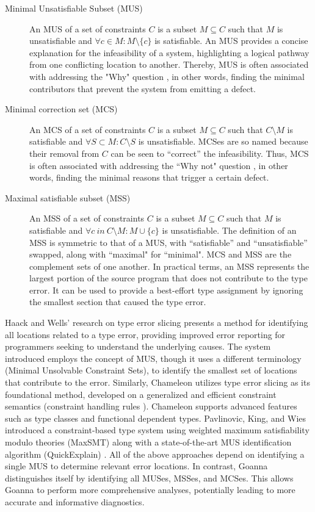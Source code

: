 \documentclass[pdflatex,lineno,sn-nature,Numbered]{sn-jnl}%
\begin{document}
\begin{description}
\item[Minimal Unsatisfiable Subset (MUS)] An MUS of a set of constraints $C$ is a subset $M \subseteq C$ such that $M$ is unsatisfiable and $ \forall{c} \in M : M \setminus \{c\}$ is satisfiable. An MUS provides a concise explanation for the infeasibility of a system, highlighting a logical pathway from one conflicting location to another. Thereby, MUS is often associated with addressing the "Why" question \cite{Ignatiev2020-xu, Nelson2017-ar}, in other words, finding the minimal contributors that prevent the system from emitting a defect.
    
\item[Minimal correction set (MCS)] An MCS of a set of constraints $C$ is a subset $M \subseteq C$ such that $C \setminus M$ is satisfiable and $\forall{S} \subset M : C \setminus S$ is unsatisfiable. MCSes are so named because their removal from $C$ can be seen to “correct” the infeasibility. Thus, MCS is often associated with addressing the ``Why not" question \cite{Ignatiev2020-xu, Nelson2017-ar}, in other words, finding the minimal reasons that trigger a certain defect. 


\item[Maximal satisfiable subset (MSS)] An MSS of a set of constraints $C$ is a subset $M \subseteq C$ such that $M$ is satisfiable and $\forall{c}\ in\ C \setminus M:M\cup\{c\}$ is unsatisfiable. The definition of an MSS is symmetric to that of a MUS, with “satisfiable” and “unsatisfiable” swapped, along with ``maximal" for ``minimal". MCS and MSS are the complement sets of one another. In practical terms, an MSS represents the largest portion of the source program that does not contribute to the type error. It can be used to provide a best-effort type assignment by ignoring the smallest section that caused the type error. 
\end{description}

Haack and Wells' research on type error slicing \cite{Haack2004-fr} presents a method for identifying all locations related to a type error, providing improved error reporting for programmers seeking to understand the underlying causes. The system introduced employs the concept of MUS, though it uses a different terminology (Minimal Unsolvable Constraint Sets), to identify the smallest set of locations that contribute to the error. Similarly, Chameleon \cite{Stuckey2003-pz} utilizes type error slicing as its foundational method, developed on a generalized and efficient constraint semantics (constraint handling rules \cite{Fruehwirth2017-ro}). Chameleon supports advanced features such as type classes and functional dependent types. Pavlinovic, King, and Wies introduced a constraint-based type system using weighted maximum satisfiability modulo theories (MaxSMT) along with a state-of-the-art MUS identification algorithm (QuickExplain) \cite{Junker2004-ds}. All of the above approaches depend on identifying a single MUS to determine relevant error locations. In contrast, Goanna distinguishes itself by identifying all MUSes, MSSes, and MCSes. This allows Goanna to perform more comprehensive analyses, potentially leading to more accurate and informative diagnostics. 
\end{document}

